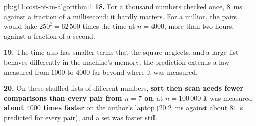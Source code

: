 \begin{solution}{pb:g11:cost-of-an-algorithm:1}
\textbf{18.} For a thousand numbers checked once, $8$~ms against a fraction of a millisecond: it hardly matters. For a
million, the pairs would take $250^2 = 62\,500$ times the time at $n = 4000$, more than two hours, against a fraction
of a second.

\textbf{19.} The time also has smaller terms that the square neglects, and a large list behaves differently in the
machine's memory; the prediction extends a law measured from $1000$ to $4000$ far beyond where it was measured.

\textbf{20.} On these shuffled lists of different numbers, \textbf{sort then scan needs fewer comparisons than every
pair from $n = 7$ on}; at $n = 100\,000$ it was measured \textbf{about $4000$ times faster} on the author's laptop
($20.2$~ms against about $81$~s predicted for every pair), and a set was faster still.
\end{solution}
